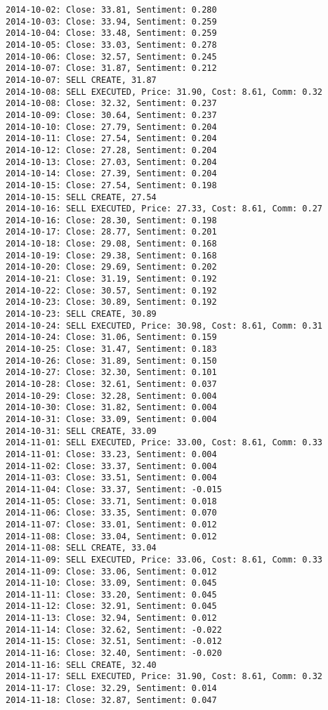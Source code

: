 \documentclass[11pt]{article}
\begin{document}
\begin{Verbatim}[commandchars=\\\{\}]
2014-10-02: Close: 33.81, Sentiment: 0.280
2014-10-03: Close: 33.94, Sentiment: 0.259
2014-10-04: Close: 33.48, Sentiment: 0.259
2014-10-05: Close: 33.03, Sentiment: 0.278
2014-10-06: Close: 32.57, Sentiment: 0.245
2014-10-07: Close: 31.87, Sentiment: 0.212
2014-10-07: SELL CREATE, 31.87
2014-10-08: SELL EXECUTED, Price: 31.90, Cost: 8.61, Comm: 0.32
2014-10-08: Close: 32.32, Sentiment: 0.237
2014-10-09: Close: 30.64, Sentiment: 0.237
2014-10-10: Close: 27.79, Sentiment: 0.204
2014-10-11: Close: 27.54, Sentiment: 0.204
2014-10-12: Close: 27.28, Sentiment: 0.204
2014-10-13: Close: 27.03, Sentiment: 0.204
2014-10-14: Close: 27.39, Sentiment: 0.204
2014-10-15: Close: 27.54, Sentiment: 0.198
2014-10-15: SELL CREATE, 27.54
2014-10-16: SELL EXECUTED, Price: 27.33, Cost: 8.61, Comm: 0.27
2014-10-16: Close: 28.30, Sentiment: 0.198
2014-10-17: Close: 28.77, Sentiment: 0.201
2014-10-18: Close: 29.08, Sentiment: 0.168
2014-10-19: Close: 29.38, Sentiment: 0.168
2014-10-20: Close: 29.69, Sentiment: 0.202
2014-10-21: Close: 31.19, Sentiment: 0.192
2014-10-22: Close: 30.57, Sentiment: 0.192
2014-10-23: Close: 30.89, Sentiment: 0.192
2014-10-23: SELL CREATE, 30.89
2014-10-24: SELL EXECUTED, Price: 30.98, Cost: 8.61, Comm: 0.31
2014-10-24: Close: 31.06, Sentiment: 0.159
2014-10-25: Close: 31.47, Sentiment: 0.183
2014-10-26: Close: 31.89, Sentiment: 0.150
2014-10-27: Close: 32.30, Sentiment: 0.101
2014-10-28: Close: 32.61, Sentiment: 0.037
2014-10-29: Close: 32.28, Sentiment: 0.004
2014-10-30: Close: 31.82, Sentiment: 0.004
2014-10-31: Close: 33.09, Sentiment: 0.004
2014-10-31: SELL CREATE, 33.09
2014-11-01: SELL EXECUTED, Price: 33.00, Cost: 8.61, Comm: 0.33
2014-11-01: Close: 33.23, Sentiment: 0.004
2014-11-02: Close: 33.37, Sentiment: 0.004
2014-11-03: Close: 33.51, Sentiment: 0.004
2014-11-04: Close: 33.37, Sentiment: -0.015
2014-11-05: Close: 33.71, Sentiment: 0.018
2014-11-06: Close: 33.35, Sentiment: 0.070
2014-11-07: Close: 33.01, Sentiment: 0.012
2014-11-08: Close: 33.04, Sentiment: 0.012
2014-11-08: SELL CREATE, 33.04
2014-11-09: SELL EXECUTED, Price: 33.06, Cost: 8.61, Comm: 0.33
2014-11-09: Close: 33.06, Sentiment: 0.012
2014-11-10: Close: 33.09, Sentiment: 0.045
2014-11-11: Close: 33.20, Sentiment: 0.045
2014-11-12: Close: 32.91, Sentiment: 0.045
2014-11-13: Close: 32.94, Sentiment: 0.012
2014-11-14: Close: 32.62, Sentiment: -0.022
2014-11-15: Close: 32.51, Sentiment: -0.012
2014-11-16: Close: 32.40, Sentiment: -0.020
2014-11-16: SELL CREATE, 32.40
2014-11-17: SELL EXECUTED, Price: 31.90, Cost: 8.61, Comm: 0.32
2014-11-17: Close: 32.29, Sentiment: 0.014
2014-11-18: Close: 32.87, Sentiment: 0.047

\end{Verbatim}
\end{document}
